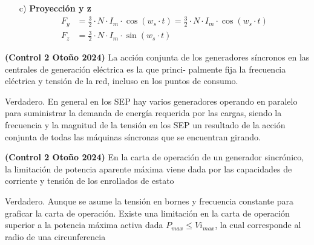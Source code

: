 \documentclass[
  11pt,
  letterpaper,
   addpoints,
   answers
  ]{exam}
\begin{document}
\begin{questions}
\begin{solution}
\begin{itemize}
    \item[c)] \textbf{Proyección y z}
    \begin{align*}
        F_y &= \frac{3}{2} \cdot N \cdot I_m \cdot \cos(w_s \cdot t) = \frac{3}{2} \cdot N \cdot I_m \cdot \cos(w_s \cdot t) \\
        F_z &= \frac{3}{2} \cdot N \cdot I_m \cdot \sin(w_s \cdot t)
    \end{align*}
\end{itemize}
  \end{solution}
  \question \textbf{(Control 2 Otoño 2024)} La acción conjunta de los generadores síncronos en las centrales de generación eléctrica es la que princi-
  palmente fija la frecuencia eléctrica y tensión de la red, incluso en los puntos de consumo.
  \begin{solution}
    Verdadero. En general en los SEP hay varios generadores operando en paralelo para suministrar la demanda de energía requerida por las cargas, siendo la frecuencia y la magnitud de la tensión en los SEP un resultado de la acción conjunta de todas las máquinas síncronas que se encuentran girando.
  \end{solution}
  \question \textbf{(Control 2 Otoño 2024)} En la carta de operación de un generador sincrónico, la limitación de potencia aparente máxima viene
  dada por las capacidades de corriente y tensión de los enrollados de estato
  \begin{solution}
    Verdadero. Aunque se asume la tensión en bornes y frecuencia constante para graficar la carta de operación. Existe una limitación en la carta de operación superior a la potencia máxima activa dada $P_{max} \leq V i_{max}$, la cual corresponde al radio de una circunferencia
  \end{solution}

\end{questions}
\end{document}
